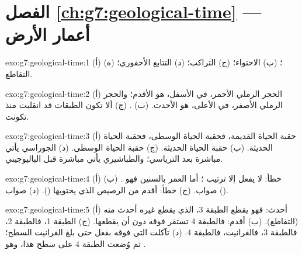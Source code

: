 \section*{الفصل \ref{ch:g7:geological-time} --- أعمار الأرض}

\begin{solution}{exo:g7:geological-time:1}
(أ) ؛ (ب) الاحتواء؛ (ج) التراكب؛ (د) التتابع الأحفوري؛ (ه)
التقاطع.
\end{solution}

\begin{solution}{exo:g7:geological-time:2}
(أ) الحجر الرملي الأحمر، في الأسفل، هو الأقدم؛ والحجر الرملي الأصفر، في
الأعلى، هو الأحدث. (ب) . (ج) ألا تكون الطبقات قد انقلبت منذ
تكونت.
\end{solution}

\begin{solution}{exo:g7:geological-time:3}
(أ) حقبة الحياة القديمة، فحقبة الحياة الوسطى، فحقبة الحياة الحديثة. (ب)
حقبة الحياة الحديثة. (ج) حقبة الحياة الوسطى. (د) الجوراسي يأتي مباشرة بعد
الترياسي؛ والطباشيري يأتي مباشرة قبل الباليوجيني.
\end{solution}

\begin{solution}{exo:g7:geological-time:4}
(أ) خطأ:  لا يفعل إلا ترتيب ؛ أما العمر بالسنين فهو . (ب) صواب. (ج) خطأ:  أقدم من الرصيص الذي يحتويها (). (د) صواب ().
\end{solution}

\begin{solution}{exo:g7:geological-time:5}
(أ) أحدث: فهو يقطع الطبقة 3،  الذي يقطع غيره أحدث منه (التقاطع).
(ب) أقدم: فالطبقة 4 تستقر فوقه دون أن يقطعها. (ج) الطبقة 1، فالطبقة 2،
فالطبقة 3، فالغرانيت، فالطبقة 4. (د) تآكلت  التي فوقه بفعل 
حتى بلغ الغرانيت السطح؛ ثم وُضعت الطبقة 4 على سطح  هذا، وهو .
\end{solution}

